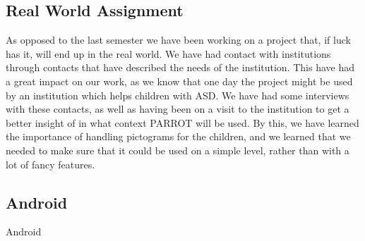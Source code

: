\subsection*{Real World Assignment}
As opposed to the last semester we have been working on a project that, if luck has it, will end up in the real world.\newline
We have had contact with institutions through contacts that have described the needs of the institution.\newline
This have had a great impact on our work, as we know that one day the project might be used by an institution which helps children with ASD. 
We have had some interviews with these contacts, as well as having been on a visit to the institution to get a better insight of in what context PARROT will be used. 
By this, we have learned the importance of handling pictograms for the children, and we learned that we needed to make sure that it could be used on a simple level, rather than with a lot of fancy features. 



\subsection*{Android}


Android
